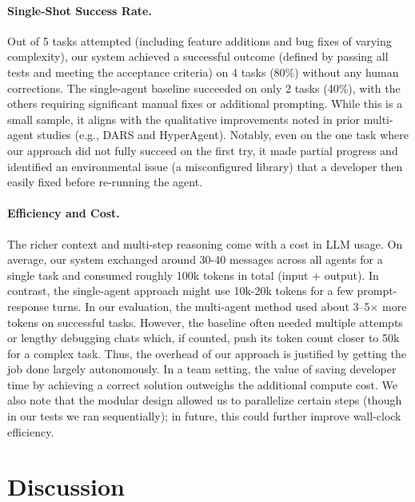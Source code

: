 \documentclass[11pt]{article}
\begin{document}
\paragraph{Single-Shot Success Rate.} Out of 5 tasks attempted (including feature additions and bug fixes of varying complexity), our system achieved a successful outcome (defined by passing all tests and meeting the acceptance criteria) on 4 tasks (80\%) without any human corrections. The single-agent baseline succeeded on only 2 tasks (40\%), with the others requiring significant manual fixes or additional prompting. While this is a small sample, it aligns with the qualitative improvements noted in prior multi-agent studies (e.g., DARS and HyperAgent). Notably, even on the one task where our approach did not fully succeed on the first try, it made partial progress and identified an environmental issue (a misconfigured library) that a developer then easily fixed before re-running the agent.

\paragraph{Efficiency and Cost.} The richer context and multi-step reasoning come with a cost in LLM usage. On average, our system exchanged around 30-40 messages across all agents for a single task and consumed roughly 100k tokens in total (input + output). In contrast, the single-agent approach might use 10k-20k tokens for a few prompt-response turns. In our evaluation, the multi-agent method used about 3–5$\times$ more tokens on successful tasks. However, the baseline often needed multiple attempts or lengthy debugging chats which, if counted, push its token count closer to 50k for a complex task. Thus, the overhead of our approach is justified by getting the job done largely autonomously. In a team setting, the value of saving developer time by achieving a correct solution outweighs the additional compute cost. We also note that the modular design allowed us to parallelize certain steps (though in our tests we ran sequentially); in future, this could further improve wall-clock efficiency.

\section{Discussion}
\end{document}
